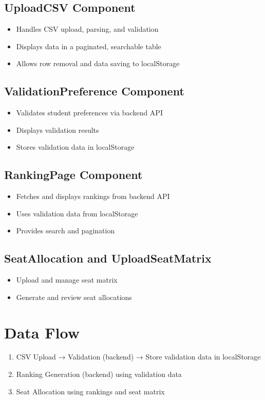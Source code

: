 \documentclass[12pt,a4paper]{article}
\begin{document}
\subsection{UploadCSV Component}
\begin{itemize}
    \item Handles CSV upload, parsing, and validation
    \item Displays data in a paginated, searchable table
    \item Allows row removal and data saving to localStorage
\end{itemize}

\subsection{ValidationPreference Component}
\begin{itemize}
    \item Validates student preferences via backend API
    \item Displays validation results
    \item Stores validation data in localStorage
\end{itemize}

\subsection{RankingPage Component}
\begin{itemize}
    \item Fetches and displays rankings from backend API
    \item Uses validation data from localStorage
    \item Provides search and pagination
\end{itemize}

\subsection{SeatAllocation and UploadSeatMatrix}
\begin{itemize}
    \item Upload and manage seat matrix
    \item Generate and review seat allocations
\end{itemize}

\section{Data Flow}
\begin{enumerate}
    \item CSV Upload → Validation (backend) → Store validation data in localStorage
    \item Ranking Generation (backend) using validation data
    \item Seat Allocation using rankings and seat matrix
\end{enumerate}
\end{document}
